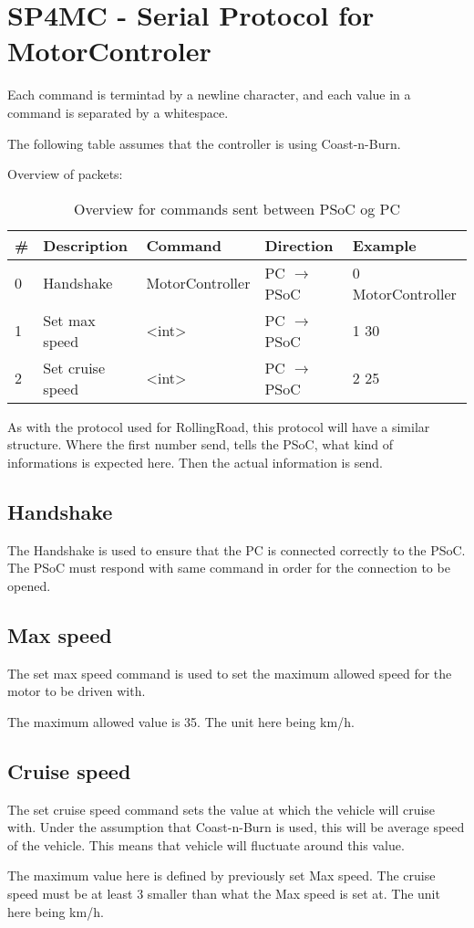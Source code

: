 

\section{SP4MC - Serial Protocol for MotorControler}
Each command is termintad by a newline character, and each value in a command is separated by a whitespace.

The following table assumes that the controller is using Coast-n-Burn.

Overview of packets:
\begin{table}[h!]
	\centering
	\label{Protocol:overviewMC}
	\begin{tabular}{l|llll}
		\# & Description 		& Command         & Direction             & Example     		\\\hline
		0  & Handshake   		& MotorController & PC $\rightarrow$ PSoC & 0 MotorController 	\\
		1  & Set max speed 	    & <int>           & PC $\rightarrow$ PSoC & 1 30 				\\
		2  & Set cruise speed	& <int>           & PC $\rightarrow$ PSoC & 2 25       			\\
	\end{tabular}
	\caption{Overview for commands sent between PSoC og PC}
\end{table}

As with the protocol used for RollingRoad, this protocol will have a similar structure. Where the first number send, tells the PSoC, what kind of informations is expected here. Then the actual information is send. 

\subsection{Handshake}
The Handshake is used to ensure that the PC is connected correctly to the PSoC. The PSoC must respond with same command in order for the connection to be opened.

\subsection{Max speed}
The set max speed command is used to set the maximum allowed speed for the motor to be driven with. 

The maximum allowed value is 35. The unit here being km/h.

\subsection{Cruise speed}
The set cruise speed command sets the value at which the vehicle will cruise with. Under the assumption that Coast-n-Burn is used, this will be average speed of the vehicle. This means that vehicle will fluctuate around this value.

The maximum value here is defined by previously set Max speed. The cruise speed must be at least 3 smaller than what the Max speed is set at. The unit here being km/h.


